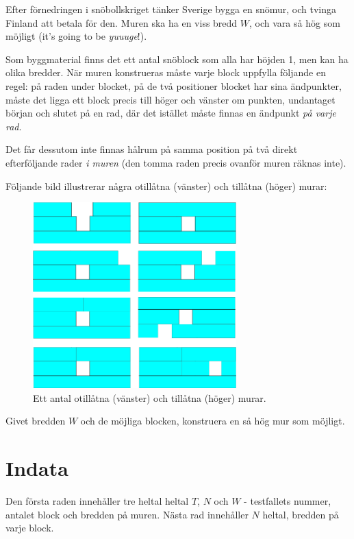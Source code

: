 Efter förnedringen i snöbollskriget tänker Sverige bygga en snömur, och tvinga Finland att betala för den.
Muren ska ha en viss bredd $W$, och vara så hög som möjligt (it's going to be \emph{yuuuge}!).

Som byggmaterial finns det ett antal snöblock som alla har höjden 1, men kan ha olika bredder.
När muren konstrueras måste varje block uppfylla följande en regel: på raden under blocket,
på de två positioner blocket har sina ändpunkter, måste det ligga ett block precis till höger och vänster om punkten,
undantaget början och slutet på en rad, där det istället måste finnas en ändpunkt \emph{på varje rad}.

Det får dessutom inte finnas hålrum på samma position på två direkt efterföljande rader \emph{i muren} (den tomma raden
precis ovanför muren räknas inte).

Följande bild illustrerar några otillåtna (vänster) och tillåtna (höger) murar:

\begin{figure}[h]
	\centering
	\includegraphics[width=0.7\textwidth]{mur.png}
	\caption{Ett antal otillåtna (vänster) och tillåtna (höger) murar.}
\end{figure}

Givet bredden $W$ och de möjliga blocken, konstruera en så hög mur som möjligt.

\section*{Indata}
Den första raden innehåller tre heltal heltal $T$, $N$ och $W$ - testfallets nummer, antalet block och bredden på muren.
Nästa rad innehåller $N$ heltal, bredden på varje block.

